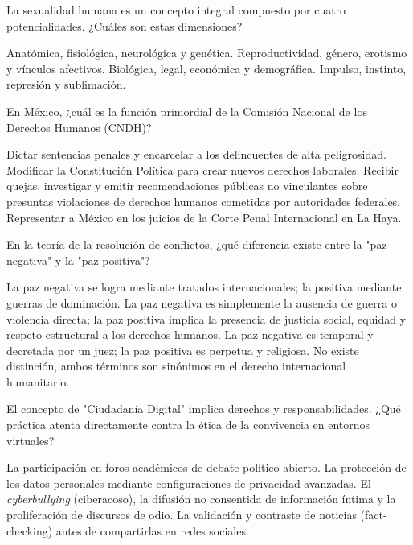 \documentclass[12pt]{evaluasep}
\begin{document}
\begin{questions}
    \question La sexualidad humana es un concepto integral compuesto por cuatro potencialidades. ¿Cuáles son estas dimensiones?
    \begin{choices}
        \choice Anatómica, fisiológica, neurológica y genética.
        \CorrectChoice Reproductividad, género, erotismo y vínculos afectivos.
        \choice Biológica, legal, económica y demográfica.
        \choice Impulso, instinto, represión y sublimación.
    \end{choices}
	

    \question En México, ¿cuál es la función primordial de la Comisión Nacional de los Derechos Humanos (CNDH)?
    \begin{choices}
        \choice Dictar sentencias penales y encarcelar a los delincuentes de alta peligrosidad.
        \choice Modificar la Constitución Política para crear nuevos derechos laborales.
        \CorrectChoice Recibir quejas, investigar y emitir recomendaciones públicas no vinculantes sobre presuntas violaciones de derechos humanos cometidas por autoridades federales.
        \choice Representar a México en los juicios de la Corte Penal Internacional en La Haya.
    \end{choices}
	

    \question En la teoría de la resolución de conflictos, ¿qué diferencia existe entre la "paz negativa" y la "paz positiva"?
    \begin{choices}
        \choice La paz negativa se logra mediante tratados internacionales; la positiva mediante guerras de dominación.
        \CorrectChoice La paz negativa es simplemente la ausencia de guerra o violencia directa; la paz positiva implica la presencia de justicia social, equidad y respeto estructural a los derechos humanos.
        \choice La paz negativa es temporal y decretada por un juez; la paz positiva es perpetua y religiosa.
        \choice No existe distinción, ambos términos son sinónimos en el derecho internacional humanitario.
    \end{choices}
	

    \question El concepto de "Ciudadanía Digital" implica derechos y responsabilidades. ¿Qué práctica atenta directamente contra la ética de la convivencia en entornos virtuales?
    \begin{choices}
        \choice La participación en foros académicos de debate político abierto.
        \choice La protección de los datos personales mediante configuraciones de privacidad avanzadas.
        \CorrectChoice El \textit{cyberbullying} (ciberacoso), la difusión no consentida de información íntima y la proliferación de discursos de odio.
        \choice La validación y contraste de noticias (fact-checking) antes de compartirlas en redes sociales.
    \end{choices}
	


\end{questions}
\end{document}
